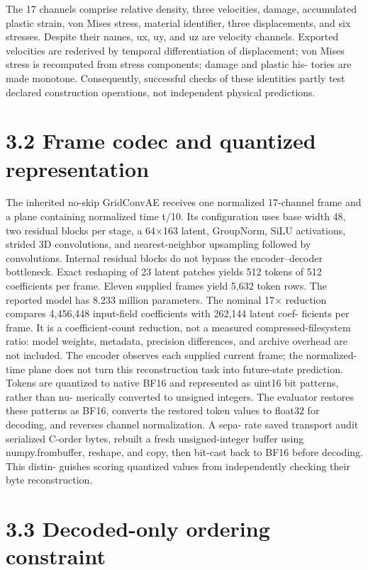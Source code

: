 \documentclass[11pt]{article}
\begin{document}
The 17 channels comprise relative density, three velocities, damage, accumulated plastic strain,
von Mises stress, material identifier, three displacements, and six stresses. Despite their names,
ux, uy, and uz are velocity channels. Exported velocities are rederived by temporal differentiation
of displacement; von Mises stress is recomputed from stress components; damage and plastic his-
tories are made monotone. Consequently, successful checks of these identities partly test declared
construction operations, not independent physical predictions.

\section*{3.2 Frame codec and quantized representation}

The inherited no-skip GridConvAE receives one normalized 17-channel frame and a plane containing
normalized time t/10. Its configuration uses base width 48, two residual blocks per stage, a 64\ensuremath{\times}163
latent, GroupNorm, SiLU activations, strided 3D convolutions, and nearest-neighbor upsampling
followed by convolutions. Internal residual blocks do not bypass the encoder–decoder bottleneck.
Exact reshaping of 23 latent patches yields 512 tokens of 512 coefficients per frame. Eleven supplied
frames yield 5,632 token rows. The reported model has 8.233 million parameters.
The nominal 17\ensuremath{\times} reduction compares 4,456,448 input-field coefficients with 262,144 latent coef-
ficients per frame. It is a coefficient-count reduction, not a measured compressed-filesystem ratio:
model weights, metadata, precision differences, and archive overhead are not included. The encoder
observes each supplied current frame; the normalized-time plane does not turn this reconstruction
task into future-state prediction.
Tokens are quantized to native BF16 and represented as uint16 bit patterns, rather than nu-
merically converted to unsigned integers. The evaluator restores these patterns as BF16, converts
the restored token values to float32 for decoding, and reverses channel normalization. A sepa-
rate saved transport audit serialized C-order bytes, rebuilt a fresh unsigned-integer buffer using
numpy.frombuffer, reshape, and copy, then bit-cast back to BF16 before decoding. This distin-
guishes scoring quantized values from independently checking their byte reconstruction.

\section*{3.3 Decoded-only ordering constraint}
\end{document}
